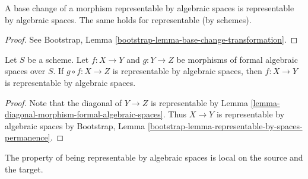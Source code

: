 \begin{lemma}
\label{lemma-base-change-representable}
A base change of a morphism representable by algebraic spaces is
representable by algebraic spaces. The same holds for representable
(by schemes).
\end{lemma}

\begin{proof}
See Bootstrap, Lemma \ref{bootstrap-lemma-base-change-transformation}.
\end{proof}

\begin{lemma}
\label{lemma-permanence-representable}
Let $S$ be a scheme. Let $f : X \to Y$ and $g : Y \to Z$ be morphisms of
formal algebraic spaces over $S$. If $g \circ f : X \to Z$ is representable
by algebraic spaces, then $f : X \to Y$ is representable by algebraic spaces.
\end{lemma}

\begin{proof}
Note that the diagonal of $Y \to Z$ is representable by
Lemma \ref{lemma-diagonal-morphism-formal-algebraic-spaces}.
Thus $X \to Y$ is representable by algebraic spaces by
Bootstrap, Lemma \ref{bootstrap-lemma-representable-by-spaces-permanence}.
\end{proof}

\noindent
The property of being representable by algebraic spaces is local on the
source and the target.

